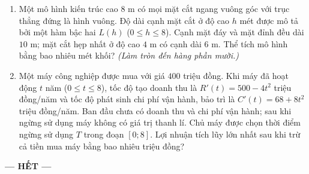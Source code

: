 \documentclass[12pt,a4paper]{article}
\begin{document}
\begin{enumerate}
\item \begin{minipage}[t]{0.55\linewidth}
Một mô hình kiến trúc cao $8$ m có mọi mặt cắt ngang vuông góc với trục thẳng đứng là hình vuông. Độ dài cạnh mặt cắt ở độ cao $h$ mét được mô tả bởi một hàm bậc hai $L(h)$ ($0\leq h\leq8$). Cạnh mặt đáy và mặt đỉnh đều dài $10$ m; mặt cắt hẹp nhất ở độ cao $4$ m có cạnh dài $6$ m. Thể tích mô hình bằng bao nhiêu mét khối? \textit{(Làm tròn đến hàng phần mười.)}
\end{minipage}\hfill
\begin{minipage}[t]{0.42\linewidth}
\vspace{-0.4\baselineskip}\centering
{}
\end{minipage}

\item Một máy công nghiệp được mua với giá $400$ triệu đồng. Khi máy đã hoạt động $t$ năm ($0\leq t\leq8$), tốc độ tạo doanh thu là $R'(t)=500-4t^2$ triệu đồng/năm và tốc độ phát sinh chi phí vận hành, bảo trì là $C'(t)=68+8t^2$ triệu đồng/năm. Ban đầu chưa có doanh thu và chi phí vận hành; sau khi ngừng sử dụng máy không có giá trị thanh lí. Chủ máy được chọn thời điểm ngừng sử dụng $T$ trong đoạn $[0;8]$. Lợi nhuận tích lũy lớn nhất sau khi trừ cả tiền mua máy bằng bao nhiêu triệu đồng?
\end{enumerate}
\begin{center}\textbf{--- HẾT ---}\end{center}
\end{document}

